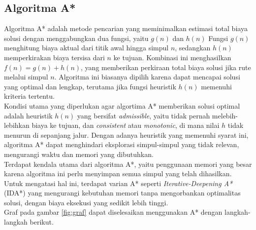 \subsection{Algoritma A* ~\cite{Russell:09:ai}}
\label{a*}
Algoritma A* adalah metode pencarian yang meminimalkan estimasi total biaya solusi dengan menggabungkan dua fungsi, yaitu $g(n)$ dan $h(n)$ Fungsi $g(n)$ menghitung biaya aktual dari titik awal hingga simpul $n$, sedangkan $h(n)$ memperkirakan biaya tersisa dari $n$ ke tujuan. Kombinasi ini menghasilkan $f(n) = g(n) + h(n)$, yang memberikan perkiraan total biaya solusi jika rute melalui simpul $n$. Algoritma ini biasanya dipilih karena dapat mencapai solusi yang optimal dan lengkap, terutama jika fungsi heuristik $h(n)$ memenuhi kriteria tertentu.
\\
Kondisi utama yang diperlukan agar algortima A* memberikan solusi optimal adalah heuristik $h(n)$ yang bersifat \textit{admissible}, yaitu tidak pernah melebih-lebihkan biaya ke tujuan, dan \textit{consistent} atau \textit{monotonic}, di mana nilai $h$ tidak menurun di sepanjang jalur. Dengan adanya heuristik yang memenuhi syarat ini, algoritma A* dapat menghindari eksplorasi simpul-simpul yang tidak relevan, mengurangi waktu dan memori yang dibutuhkan.
\\
Terdapat kendala utama dari algoritma A*, yaitu penggunaan memori yang besar karena algoritma ini perlu menyimpan semua simpul yang telah dihasilkan. Untuk mengatasi hal ini, terdapat varian A* seperti \textit{Iterative-Deepening A*} (IDA*) yang mengurangi kebutuhan memori tanpa mengorbankan optimalitas solusi, dengan biaya eksekusi yang sedikit lebih tinggi.
\\
Graf pada gambar \ref{fig:graf} dapat diselesaikan menggunakan A* dengan langkah-langkah berikut.

